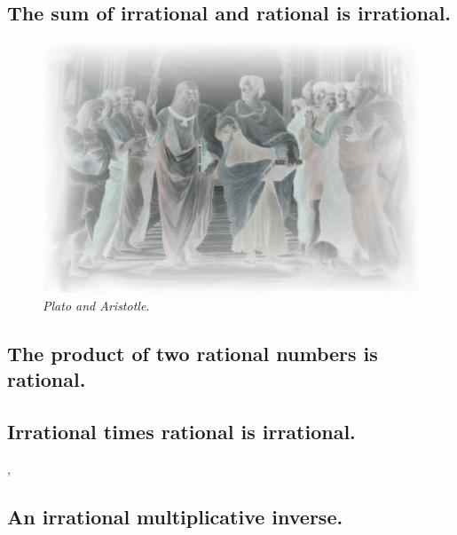 \documentclass[preview]{standalone}
\begin{document}
\subsection{The sum of irrational and rational is irrational.}

\begin{figure}[h!]
    \centering
    \includegraphics[width=12.5cm]{../resources/jpg/1.6.introduction.to.proofs/plato-republic.jpg}
    \caption*{\emph{Plato and Aristotle.}}
\end{figure}


\subsection{The product of two rational numbers is rational.}

\pagebreak


\subsection{Irrational times rational is irrational.}

\sep


\subsection{An irrational multiplicative inverse.}

\pagebreak
\end{document}

